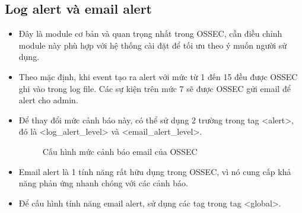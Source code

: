   \subsection{Log alert và email alert}
  \begin{itemize}
    \item Đây là module cơ bản và quan trọng nhất trong OSSEC, cần điều chỉnh module này phù hợp với hệ thống cài đặt để tối ưu theo ý muốn người sử dụng.
    \item Theo mặc định, khi event tạo ra alert với mức từ 1 đến 15 đều được OSSEC ghi vào trong log file. Các sự kiện trên mức 7 sẽ được OSSEC gửi email để alert cho admin.
    \item Để thay đổi mức cảnh báo này, có thể sử dụng 2 trường trong tag
    \textless alert\textgreater, đó là \textless log\_alert\_level\textgreater{} và
    \textless email\_alert\_level\textgreater.
    \begin{figure}[h!]
	\centering 
{}
	\caption{Cấu hình mức cảnh báo email của OSSEC}
  \end{figure}
     \item Email alert là 1 tính năng rất hữu dụng trong OSSEC, vì nó cung cấp
     khả năng phản ứng nhanh chóng với các cảnh báo.
     \item Để cấu hình tính năng email alert, sử dụng các tag trong tag
     \textless global\textgreater.
     \begin{figure}[h!]
	\centering 
{}

\end{figure}
\end{itemize}
